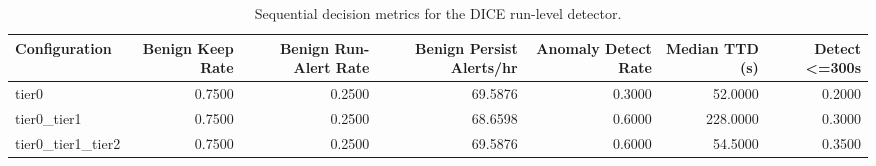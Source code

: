 \begin{table}[t]
\centering
\caption{Sequential decision metrics for the DICE run-level detector.}
\label{tab:dice_sequential_metrics}
\footnotesize
\begin{tabular}{lrrrrrr}
\toprule
Configuration & Benign Keep Rate & Benign Run-Alert Rate & Benign Persist Alerts/hr & Anomaly Detect Rate & Median TTD (s) & Detect <=300s \\
\midrule
tier0 & 0.7500 & 0.2500 & 69.5876 & 0.3000 & 52.0000 & 0.2000 \\
tier0_tier1 & 0.7500 & 0.2500 & 68.6598 & 0.6000 & 228.0000 & 0.3000 \\
tier0_tier1_tier2 & 0.7500 & 0.2500 & 69.5876 & 0.6000 & 54.5000 & 0.3500 \\
\bottomrule
\end{tabular}

\end{table}
